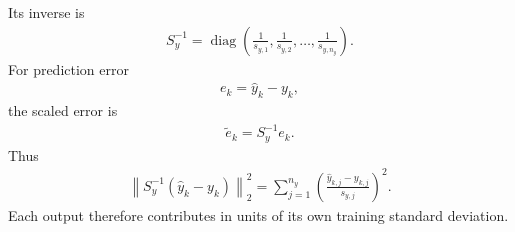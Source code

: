 \documentclass[11pt]{article}
\begin{document}
Its inverse is
\begin{align}
\boxed{S_y^{-1}=\operatorname{diag}\left(\frac{1}{s_{y,1}},\frac{1}{s_{y,2}},\ldots,\frac{1}{s_{y,n_y}}\right).}
\tag{P2.17}
\end{align}
For prediction error
\begin{align}
e_k=\widehat y_k-y_k,
\end{align}
the scaled error is
\begin{align}
\boxed{\widetilde e_k=S_y^{-1}e_k.}
\tag{P2.18}
\end{align}
Thus
\begin{align}
\boxed{\left\|S_y^{-1}(\widehat y_k-y_k)\right\|_2^2=\sum_{j=1}^{n_y}\left(\frac{\widehat y_{k,j}-y_{k,j}}{s_{y,j}}\right)^2.}
\tag{P2.19}
\end{align}
Each output therefore contributes in units of its own training standard deviation.
\end{document}
